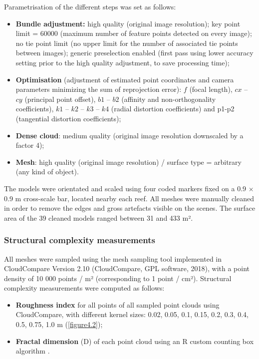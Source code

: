 Parametrisation of the different steps was set as follows: 
\begin{itemize}
    \item \textbf{Bundle adjustment:} high quality (original image resolution); key point limit = 60000 (maximum number of feature points detected on every image); no tie point limit (no upper limit for the number of associated tie points between images); generic preselection enabled (first pass using lower accuracy setting prior to the high quality adjustment, to save processing time);
    
    \item \textbf{Optimisation} (adjustment of estimated point coordinates and camera parameters minimizing the sum of reprojection error): $f$ (focal length), $cx$ – $cy$ (principal point offset), $b1$ – $b2$ (affinity and non-orthogonality coefficients), $k1$ – $k2$ – $k3$ – $k4$ (radial distortion coefficients) and p1-p2 (tangential distortion coefficients);
    
    \item \textbf{Dense cloud}: medium quality (original image resolution downscaled by a factor 4);
    
    \item \textbf{Mesh}: high quality (original image resolution) / surface type = arbitrary (any kind of object).
\end{itemize}

The models were orientated and scaled using four coded markers fixed on a 0.9 $\times$ 0.9 m cross-scale bar, located nearby each reef. All meshes were manually cleaned in order to remove the edges and gross artefacts visible on the scenes. The surface area of the 39 cleaned models ranged between 31 and 433 m². 

\subsubsection{Structural complexity measurements}\label{chapitre4_2.1.2}
All meshes were sampled using the mesh sampling tool implemented in CloudCompare Version 2.10 (CloudCompare, GPL software, 2018), with a point density of 10 000 points / m² (corresponding to 1 point / cm²). Structural complexity measurements were computed as follows:

\begin{itemize}
    \item \textbf{Roughness index} for all points of all sampled point clouds using CloudCompare, with different kernel sizes: 0.02, 0.05, 0.1, 0.15, 0.2, 0.3, 0.4, 0.5, 0.75, 1.0 m (\autoref{figure4.2});
    
    \item \textbf{Fractal dimension} (D) of each point cloud using an R \citep{r_core_team_r_2020} custom counting box algorithm \citep{liebovitch_fast_1989}.
    
\end{itemize}

